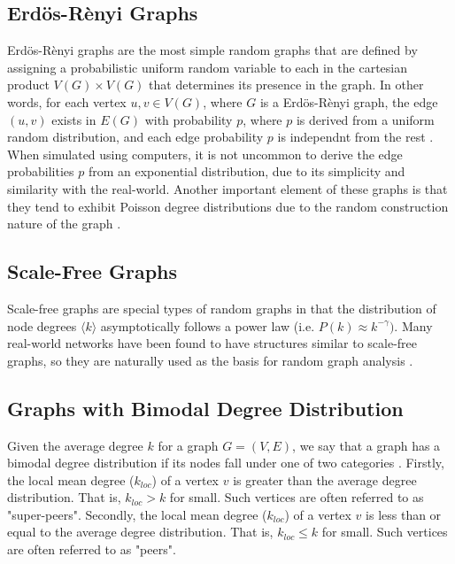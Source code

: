 \documentclass[doc]{apa}%
\begin{document}
\subsection{Erd\"{o}s-R\`{e}nyi Graphs}
Erd\"{o}s-R\`{e}nyi graphs are the most simple random graphs that are defined by assigning a probabilistic uniform random variable to each in the cartesian product $V(G) \times V(G)$ that determines its presence in the graph. In other words, for each vertex $u, v \in V(G)$, where $G$ is a Erd\"{o}s-R\`{e}nyi graph, the edge $(u,v)$ exists in $E(G)$ with probability $p$, where $p$ is derived from a uniform random distribution, and each edge probability $p$ is independnt from the rest \cite{LargeNetworkRobustness-PVM}. When simulated using computers, it is not uncommon to derive the edge probabilities $p$ from an exponential distribution, due to its simplicity and similarity with the real-world. Another important element of these graphs is that they tend to exhibit Poisson degree distributions due to the random construction nature of the graph \cite{bimodal}.


\subsection{Scale-Free Graphs}
Scale-free graphs are special types of random graphs in that the distribution of node degrees $\langle k \rangle$ asymptotically follows a power law (i.e. $P(k) \approx k^{-\gamma})$. Many real-world networks have been found to have structures similar to scale-free graphs, so they are naturally used as the basis for random graph analysis \cite{AttacksWavesRandom}. 


\subsection{Graphs with Bimodal Degree Distribution}

Given the average degree $k$ for a graph $G = (V,E)$, we say that a graph has a bimodal degree distribution if its nodes fall under one of two categories \cite{bimodal}. Firstly, the local mean degree ($k_{loc}$) of a vertex $v$ is greater than the average degree distribution. That is, $k_{loc} > k$ for small. Such vertices are often referred to as "super-peers". Secondly, the local mean degree ($k_{loc}$) of a vertex $v$ is less than or equal to the average degree distribution. That is, $k_{loc} \leq k$ for small. Such vertices are often referred to as "peers".
\end{document}
